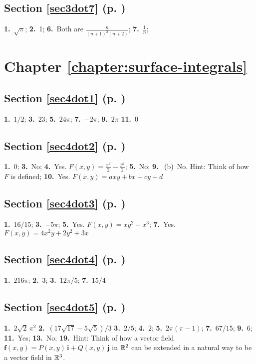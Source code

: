 \begin{multicols}{2}
\subsection*{Section \ref{sec3dot7} (p. \pageref{sec3dot7})}

\textbf{1.}~$\sqrt{\pi}$;\quad
\textbf{2.}~1;\quad
\textbf{6.}~Both are $\frac{n}{(n+1)^2 (n+2)}$;\quad
\textbf{7.}~$\frac{1}{n}$;\quad

\section*{Chapter \ref{chapter:surface-integrals}}
\subsection*{Section \ref{sec4dot1} (p. \pageref{sec4dot1})}

\textbf{1.}~$1/2$;\quad
\textbf{3.}~$23$;\quad
\textbf{5.}~$24\pi$;\quad
\textbf{7.}~$-2\pi$;\quad
\textbf{9.}~$2\pi$
\textbf{11.}~$0$
\subsection*{Section \ref{sec4dot2} (p. \pageref{sec4dot2})}

\textbf{1.}~$0$;\quad
\textbf{3.}~No;\quad
\textbf{4.}~Yes. $F(x,y)=\frac{x^2}{2}-\frac{y^2}{2}$;\quad
\textbf{5.}~No;\quad
\textbf{9.}~
(b)~No. Hint: Think of how $F$ is defined;\quad
\textbf{10.}~Yes. $F(x,y)=axy+bx+cy+d$
\subsection*{Section \ref{sec4dot3} (p. \pageref{sec4dot3})}

\textbf{1.}~$16/15$;\quad
\textbf{3.}~$-5\pi$;\quad
\textbf{5.}~Yes. $F(x,y)=xy^2 + x^3$;\quad
\textbf{7.}~Yes. $F(x,y)=4x^2 y + 2y^2 + 3x$

\subsection*{Section \ref{sec4dot4} (p. \pageref{sec4dot4})}

\textbf{1.}~$216\pi$;\quad
\textbf{2.}~$3$;\quad
\textbf{3.}~$12\pi/5$;\quad
\textbf{7.}~$15/4$
\subsection*{Section \ref{sec4dot5} (p. \pageref{sec4dot5})}

\textbf{1.}~$2\sqrt{2}\,\pi^2$\quad
\textbf{2.}~$(17\sqrt{17} - 5\sqrt{5})/3$\quad
\textbf{3.}~$2/5$;\quad
\textbf{4.}~$2$;\quad
\textbf{5.}~$2\pi (\pi - 1)$;\quad
\textbf{7.}~$67/15$;\quad
\textbf{9.}~$6$; \quad
\textbf{11.}~Yes;\quad
\textbf{13.}~No;\quad
\textbf{19.}~Hint: Think of how a vector field $\textbf{f}(x,y) = P(x,y)\,\textbf{i} + Q(x,y)\,\textbf{j}$ in
$\mathbb{R}^{2}$ can be extended in a natural way to be a vector field in $\mathbb{R}^{3}$.

\end{multicols}
